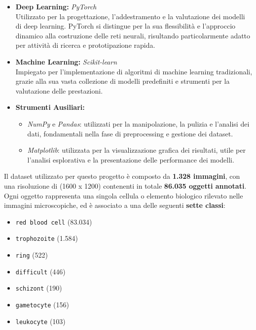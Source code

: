 \documentclass[minted, draw]{../tex/hebdomon}
\begin{document}
\begin{itemize}
    \item \textbf{Deep Learning:} \textit{PyTorch} \\
    Utilizzato per la progettazione, l’addestramento e la valutazione dei modelli di deep learning. PyTorch si distingue per la sua flessibilità e l’approccio dinamico alla costruzione delle reti neurali, risultando particolarmente adatto per attività di ricerca e prototipazione rapida.

    \item \textbf{Machine Learning:} \textit{Scikit-learn} \\
    Impiegato per l’implementazione di algoritmi di machine learning tradizionali, grazie alla sua vasta collezione di modelli predefiniti e strumenti per la valutazione delle prestazioni.

    \item \textbf{Strumenti Ausiliari:}
    \begin{itemize}
        \item \textit{NumPy} e \textit{Pandas}: utilizzati per la manipolazione, la pulizia e l’analisi dei dati, fondamentali nella fase di preprocessing e gestione dei dataset.
        \item \textit{Matplotlib}: utilizzata per la visualizzazione grafica dei risultati, utile per l’analisi esplorativa e la presentazione delle performance dei modelli.
    \end{itemize}
\end{itemize}


Il dataset utilizzato per questo progetto è composto da \textbf{1.328 immagini}, con una risoluzione di (1600 x  1200) contenenti in totale \textbf{86.035 oggetti annotati}. Ogni oggetto rappresenta una singola cellula o elemento biologico rilevato nelle immagini microscopiche, ed è associato a una delle seguenti \textbf{sette classi}:

\begin{itemize}
    \item \texttt{red blood cell} (83.034)
    \item \texttt{trophozoite} (1.584)
    \item \texttt{ring} (522)
    \item \texttt{difficult} (446)
    \item \texttt{schizont} (190)
    \item \texttt{gametocyte} (156)
    \item \texttt{leukocyte} (103)
\end{itemize}
\end{document}
